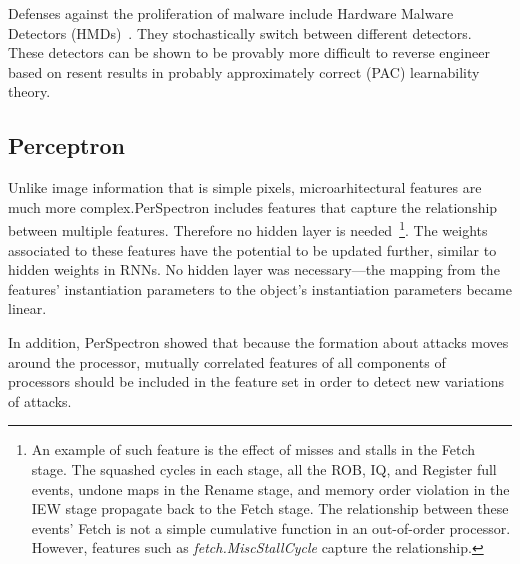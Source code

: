 Defenses against the proliferation of malware include Hardware Malware Detectors (HMDs)~\cite{RHMD2017}. They stochastically switch between different detectors. These detectors can be shown to be provably more difficult to
reverse engineer based on resent results in probably approximately
correct (PAC) learnability theory. 


\subsection{Perceptron}
Unlike image information that is simple pixels, microarhitectural features are much more complex.PerSpectron includes features that capture the relationship between multiple features. Therefore no hidden layer is needed~\footnote{An example of such feature is the effect of misses and stalls 
in the Fetch stage. The squashed cycles in each stage, all the ROB, IQ, and 
Register full events, undone maps in the Rename stage, and memory order 
violation in the IEW stage propagate back to the Fetch stage. The relationship 
between these events' Fetch is not a simple cumulative function in an out-of-order 
processor. However, features such as \textit{fetch.MiscStallCycle} capture the 
relationship.}. The weights associated to these features have the potential to be updated further, similar to hidden weights in RNNs.
No hidden layer was necessary---the 
mapping from the features' instantiation parameters to the object's 
instantiation parameters became linear. 

In addition, PerSpectron showed that because the formation about attacks moves around the
processor, mutually correlated features of all components of processors should be included in the feature set in order to detect new variations of attacks. 

